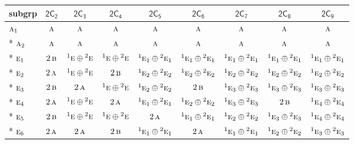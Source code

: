 \documentclass[10pt,a4paper]{article}
\numberwithin{equation}{section}
\newcommand{\grp}[1]{\mathsf{#1}}
\newcommand{\irr}[1]{\text{\normalfont\scshape #1}}
\newcommand{\conjpair}[1]{{}^{#1}}
\begin{document}
{\small\begin{longtable}{@{}lcccccccc@{}}\toprule
subgrp & \href{2C2.pdf}{$\grp{2C_{2}}$} & \href{2C3.pdf}{$\grp{2C_{3}}$} & \href{2C4.pdf}{$\grp{2C_{4}}$} & \href{2C5.pdf}{$\grp{2C_{5}}$} & \href{2C6.pdf}{$\grp{2C_{6}}$} & \href{2C7.pdf}{$\grp{2C_{7}}$} & \href{2C8.pdf}{$\grp{2C_{8}}$} & \href{2C9.pdf}{$\grp{2C_{9}}$}\\\midrule\endhead
\bottomrule\endfoot\endlastfoot
$\irr{a}_{1}$ & $\irr{a}$ & $\irr{a}$ & $\irr{a}$ & $\irr{a}$ & $\irr{a}$ & $\irr{a}$ & $\irr{a}$ & $\irr{a}$\\*
$\irr{a}_{2}$ & $\irr{a}$ & $\irr{a}$ & $\irr{a}$ & $\irr{a}$ & $\irr{a}$ & $\irr{a}$ & $\irr{a}$ & $\irr{a}$\\*
$\irr{e}_{1}$ & $2\,\irr{b}$ & $\conjpair{1}\irr{e}\oplus \conjpair{2}\irr{e}$ & $\conjpair{1}\irr{e}\oplus \conjpair{2}\irr{e}$ & $\conjpair{1}\irr{e}_{1}\oplus \conjpair{2}\irr{e}_{1}$ & $\conjpair{1}\irr{e}_{1}\oplus \conjpair{2}\irr{e}_{1}$ & $\conjpair{1}\irr{e}_{1}\oplus \conjpair{2}\irr{e}_{1}$ & $\conjpair{1}\irr{e}_{1}\oplus \conjpair{2}\irr{e}_{1}$ & $\conjpair{1}\irr{e}_{1}\oplus \conjpair{2}\irr{e}_{1}$\\*
$\irr{e}_{2}$ & $2\,\irr{a}$ & $\conjpair{1}\irr{e}\oplus \conjpair{2}\irr{e}$ & $2\,\irr{b}$ & $\conjpair{1}\irr{e}_{2}\oplus \conjpair{2}\irr{e}_{2}$ & $\conjpair{1}\irr{e}_{2}\oplus \conjpair{2}\irr{e}_{2}$ & $\conjpair{1}\irr{e}_{2}\oplus \conjpair{2}\irr{e}_{2}$ & $\conjpair{1}\irr{e}_{2}\oplus \conjpair{2}\irr{e}_{2}$ & $\conjpair{1}\irr{e}_{2}\oplus \conjpair{2}\irr{e}_{2}$\\*
$\irr{e}_{3}$ & $2\,\irr{b}$ & $2\,\irr{a}$ & $\conjpair{1}\irr{e}\oplus \conjpair{2}\irr{e}$ & $\conjpair{1}\irr{e}_{2}\oplus \conjpair{2}\irr{e}_{2}$ & $2\,\irr{b}$ & $\conjpair{1}\irr{e}_{3}\oplus \conjpair{2}\irr{e}_{3}$ & $\conjpair{1}\irr{e}_{3}\oplus \conjpair{2}\irr{e}_{3}$ & $\conjpair{1}\irr{e}_{3}\oplus \conjpair{2}\irr{e}_{3}$\\*
$\irr{e}_{4}$ & $2\,\irr{a}$ & $\conjpair{1}\irr{e}\oplus \conjpair{2}\irr{e}$ & $2\,\irr{a}$ & $\conjpair{1}\irr{e}_{1}\oplus \conjpair{2}\irr{e}_{1}$ & $\conjpair{1}\irr{e}_{2}\oplus \conjpair{2}\irr{e}_{2}$ & $\conjpair{1}\irr{e}_{3}\oplus \conjpair{2}\irr{e}_{3}$ & $2\,\irr{b}$ & $\conjpair{1}\irr{e}_{4}\oplus \conjpair{2}\irr{e}_{4}$\\*
$\irr{e}_{5}$ & $2\,\irr{b}$ & $\conjpair{1}\irr{e}\oplus \conjpair{2}\irr{e}$ & $\conjpair{1}\irr{e}\oplus \conjpair{2}\irr{e}$ & $2\,\irr{a}$ & $\conjpair{1}\irr{e}_{1}\oplus \conjpair{2}\irr{e}_{1}$ & $\conjpair{1}\irr{e}_{2}\oplus \conjpair{2}\irr{e}_{2}$ & $\conjpair{1}\irr{e}_{3}\oplus \conjpair{2}\irr{e}_{3}$ & $\conjpair{1}\irr{e}_{4}\oplus \conjpair{2}\irr{e}_{4}$\\*
$\irr{e}_{6}$ & $2\,\irr{a}$ & $2\,\irr{a}$ & $2\,\irr{b}$ & $\conjpair{1}\irr{e}_{1}\oplus \conjpair{2}\irr{e}_{1}$ & $2\,\irr{a}$ & $\conjpair{1}\irr{e}_{1}\oplus \conjpair{2}\irr{e}_{1}$ & $\conjpair{1}\irr{e}_{2}\oplus \conjpair{2}\irr{e}_{2}$ & $\conjpair{1}\irr{e}_{3}\oplus \conjpair{2}\irr{e}_{3}$\\
\bottomrule\end{longtable}}
\end{document}
